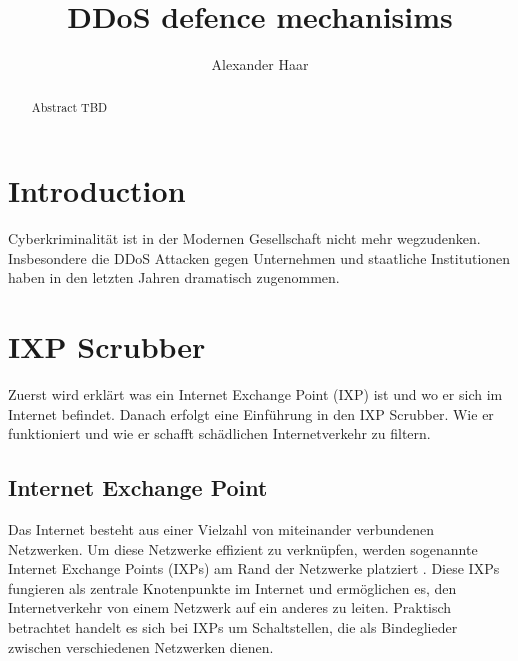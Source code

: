 \documentclass[sigplan,screen]{acmart}
\begin{document}
\title{DDoS defence mechanisims }

\author{Alexander Haar}

\begin{abstract}
  Abstract TBD
\end{abstract}



\maketitle

\section{Introduction}
Cyberkriminalität ist in der Modernen Gesellschaft nicht mehr wegzudenken. Insbesondere die DDoS Attacken gegen Unternehmen und staatliche Institutionen haben in den letzten Jahren dramatisch zugenommen.

\section{IXP Scrubber}
Zuerst wird erklärt was ein Internet Exchange Point (IXP) ist und wo er sich im Internet befindet. Danach erfolgt eine Einführung in den IXP Scrubber. Wie er funktioniert und wie er schafft schädlichen Internetverkehr zu filtern.

\subsection{Internet Exchange Point}
Das Internet besteht aus einer Vielzahl von miteinander verbundenen Netzwerken. Um diese Netzwerke effizient zu verknüpfen, werden sogenannte Internet Exchange Points (IXPs) am Rand der Netzwerke platziert \cite{Cloudflare01}. Diese IXPs fungieren als zentrale Knotenpunkte im Internet und ermöglichen es, den Internetverkehr von einem Netzwerk auf ein anderes zu leiten. Praktisch betrachtet handelt es sich bei IXPs um Schaltstellen, die als Bindeglieder zwischen verschiedenen Netzwerken dienen.
\end{document}
